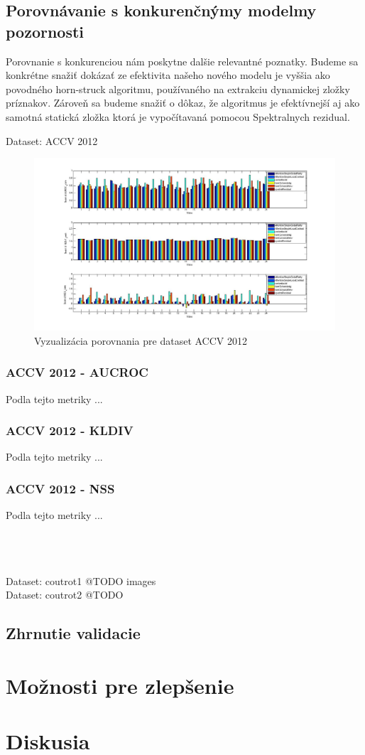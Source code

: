 \subsection{Porovnávanie s konkurenčnýmy modelmy pozornosti}
Porovnanie s konkurenciou nám poskytne dalšie relevantné poznatky.
Budeme sa konkrétne snažiť dokázať ze efektivita našeho nového modelu je vyššia ako povodného horn-struck algoritmu\cite{horn-schunck}, používaného na extrakciu dynamickej zložky príznakov.
Zároveň sa budeme snažiť o dôkaz, že algoritmus je efektívnejší aj ako samotná statická zložka ktorá je vypočítavaná pomocou Spektralnych rezidual\cite{spectral-rezidual}.

Dataset: ACCV 2012\cite{accv}
\begin{figure}[H]
  \includegraphics[width=15cm]{pics/porovnanie-accv.jpg}
  \caption{Vyzualizácia porovnania pre dataset ACCV 2012\cite{accv}}
\end{figure}

\subsubsection{ACCV 2012 - AUCROC}
Podla tejto metriky ...
\subsubsection{ACCV 2012 - KLDIV}
Podla tejto metriky ...
\subsubsection{ACCV 2012 - NSS}
Podla tejto metriky ...

\\
\\
\\
Dataset: coutrot1\cite{accv}
@TODO images\\
Dataset: coutrot2\cite{accv}
@TODO \\

\subsection{Zhrnutie validacie}

\section{Možnosti pre zlepšenie}
\section{Diskusia}
